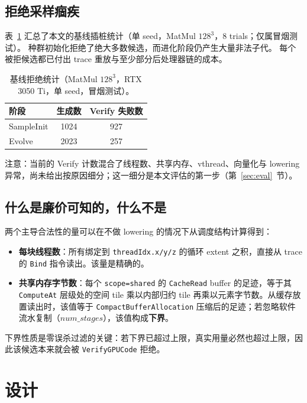 \documentclass[UTF8]{ctexart}
\begin{document}
\subsection{拒绝采样痼疾}

表~\ref{tab:motivation} 汇总了本文的基线插桩统计（单 seed，MatMul $128^3$，8 trials；仅属冒烟测试）。
种群初始化拒绝了绝大多数候选，而进化阶段仍产生大量非法子代。
每个被拒候选都已付出 trace 重放与至少部分后处理器链的成本。

\begin{table}[t]
\centering
\caption{基线拒绝统计（MatMul $128^3$，RTX 3050 Ti，单 seed，冒烟测试）。}
\label{tab:motivation}
\begin{tabular}{lcc}
\toprule
阶段 & 生成数 & Verify 失败数 \\
\midrule
SampleInit & 1024 & 927 \\
Evolve & 2023 & 257 \\
\bottomrule
\end{tabular}
\end{table}

注意：当前的 Verify 计数混合了线程数、共享内存、vthread、向量化与 lowering 异常，尚未给出按原因细分；这一细分是本文评估的第一步（第~\ref{sec:eval}~节）。

\subsection{什么是廉价可知的，什么不是}

两个主导合法性的量可以在不做 lowering 的情况下从调度结构计算得到：

\begin{itemize}
\item \textbf{每块线程数}：所有绑定到 \texttt{threadIdx.x/y/z} 的循环 extent 之积，直接从 trace 的 \texttt{Bind} 指令读出。该量是精确的。
\item \textbf{共享内存字节数}：每个 \texttt{scope=shared} 的 \texttt{CacheRead} buffer 的足迹，等于其 \texttt{ComputeAt} 层级处的空间 tile 乘以内部归约 tile 再乘以元素字节数。从缓存放置读出时，该值等于 \texttt{CompactBufferAllocation} 压缩后的足迹；若忽略软件流水复制（$num\_stages$），该值构成\textbf{下界}。
\end{itemize}

下界性质是零误杀过滤的关键：若下界已超过上限，真实用量必然也超过上限，因此该候选本来就会被 \texttt{VerifyGPUCode} 拒绝。

\section{设计}
\label{sec:design}
\end{document}
